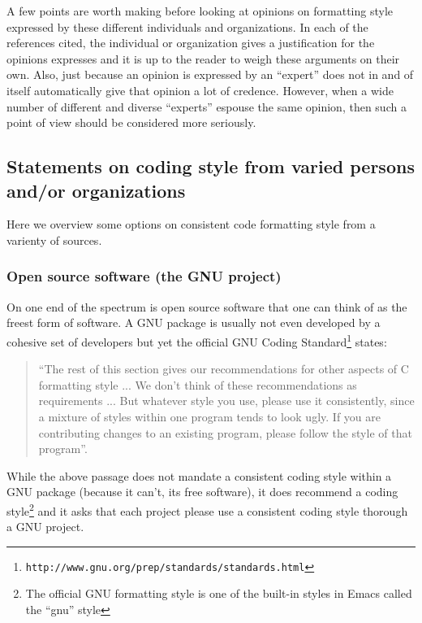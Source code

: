 A few points are worth making before looking at opinions on formatting style
expressed by these different individuals and organizations.  In each of the
references cited, the individual or organization gives a justification for the
opinions expresses and it is up to the reader to weigh these arguments on
their own.  Also, just because an opinion is expressed by an ``expert'' does
not in and of itself automatically give that opinion a lot of credence.
However, when a wide number of different and diverse ``experts'' espouse the
same opinion, then such a point of view should be considered more seriously.

%
\subsection{Statements on coding style from varied persons and/or organizations}
%

Here we overview some options on consistent code formatting style from a
varienty of sources.

%
\subsubsection{Open source software (the GNU project)}
%

On one end of the spectrum is open source software that one can think of as
the freest form of software.  A GNU package is usually not even developed by a
cohesive set of developers but yet the official GNU Coding
Standard\footnote{{}\texttt{http://www.gnu.org/prep/standards/standards.html}}
states:

\begin{quote}

``The rest of this section gives our recommendations for other aspects of C
formatting style ... We don't think of these recommendations as requirements
... But whatever style you use, please use it consistently, since a mixture of
styles within one program tends to look ugly. If you are contributing changes
to an existing program, please follow the style of that program''.

\end{quote}

While the above passage does not mandate a consistent coding style within a
GNU package (because it can't, its free software), it does recommend a coding
style\footnote{The official GNU formatting style is one of the built-in styles
in Emacs called the ``gnu'' style} and it asks that each project please use a
consistent coding style thorough a GNU project.

